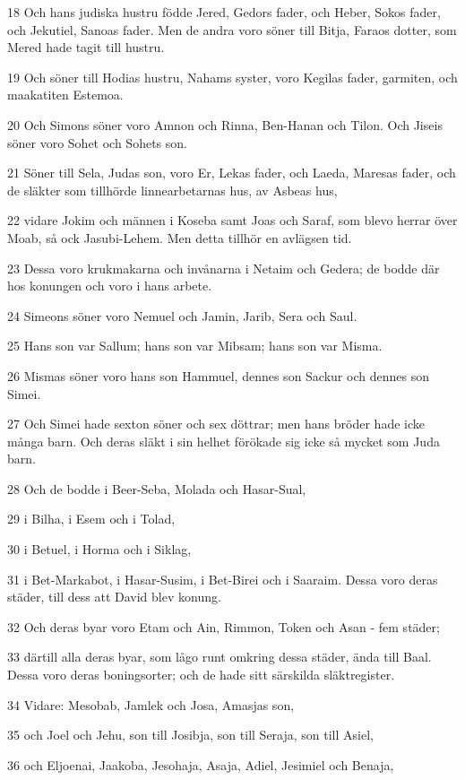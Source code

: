 \par 18 Och hans judiska hustru födde Jered, Gedors fader, och Heber, Sokos fader, och Jekutiel, Sanoas fader. Men de andra voro söner till Bitja, Faraos dotter, som Mered hade tagit till hustru.
\par 19 Och söner till Hodias hustru, Nahams syster, voro Kegilas fader, garmiten, och maakatiten Estemoa.
\par 20 Och Simons söner voro Amnon och Rinna, Ben-Hanan och Tilon. Och Jiseis söner voro Sohet och Sohets son.
\par 21 Söner till Sela, Judas son, voro Er, Lekas fader, och Laeda, Maresas fader, och de släkter som tillhörde linnearbetarnas hus, av Asbeas hus,
\par 22 vidare Jokim och männen i Koseba samt Joas och Saraf, som blevo herrar över Moab, så ock Jasubi-Lehem. Men detta tillhör en avlägsen tid.
\par 23 Dessa voro krukmakarna och invånarna i Netaim och Gedera; de bodde där hos konungen och voro i hans arbete.
\par 24 Simeons söner voro Nemuel och Jamin, Jarib, Sera och Saul.
\par 25 Hans son var Sallum; hans son var Mibsam; hans son var Misma.
\par 26 Mismas söner voro hans son Hammuel, dennes son Sackur och dennes son Simei.
\par 27 Och Simei hade sexton söner och sex döttrar; men hans bröder hade icke många barn. Och deras släkt i sin helhet förökade sig icke så mycket som Juda barn.
\par 28 Och de bodde i Beer-Seba, Molada och Hasar-Sual,
\par 29 i Bilha, i Esem och i Tolad,
\par 30 i Betuel, i Horma och i Siklag,
\par 31 i Bet-Markabot, i Hasar-Susim, i Bet-Birei och i Saaraim. Dessa voro deras städer, till dess att David blev konung.
\par 32 Och deras byar voro Etam och Ain, Rimmon, Token och Asan - fem städer;
\par 33 därtill alla deras byar, som lågo runt omkring dessa städer, ända till Baal. Dessa voro deras boningsorter; och de hade sitt särskilda släktregister.
\par 34 Vidare: Mesobab, Jamlek och Josa, Amasjas son,
\par 35 och Joel och Jehu, son till Josibja, son till Seraja, son till Asiel,
\par 36 och Eljoenai, Jaakoba, Jesohaja, Asaja, Adiel, Jesimiel och Benaja,
